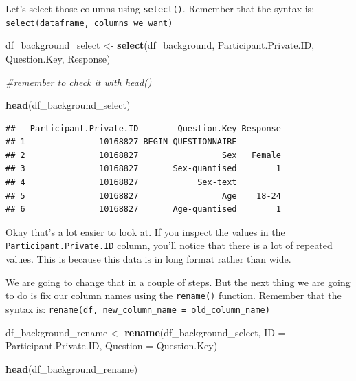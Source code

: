 \documentclass[
]{book}
\newenvironment{Shaded}{\begin{snugshade}}{\end{snugshade}}
\newcommand{\AttributeTok}[1]{\textcolor[rgb]{0.13,0.29,0.53}{#1}}
\newcommand{\CommentTok}[1]{\textcolor[rgb]{0.56,0.35,0.01}{\textit{#1}}}
\newcommand{\FunctionTok}[1]{\textcolor[rgb]{0.13,0.29,0.53}{\textbf{#1}}}
\newcommand{\NormalTok}[1]{#1}
\newcommand{\OtherTok}[1]{\textcolor[rgb]{0.56,0.35,0.01}{#1}}
\begin{document}
Let's select those columns using \texttt{select()}. Remember that the syntax is: \texttt{select(dataframe,\ columns\ we\ want)}

\begin{Shaded}
\begin{Highlighting}[]
\NormalTok{df\_background\_select }\OtherTok{\textless{}{-}} \FunctionTok{select}\NormalTok{(df\_background,}
\NormalTok{                               Participant.Private.ID,}
\NormalTok{                               Question.Key,}
\NormalTok{                               Response)}

\CommentTok{\#remember to check it with head()}

\FunctionTok{head}\NormalTok{(df\_background\_select)}
\end{Highlighting}
\end{Shaded}

\begin{verbatim}
##   Participant.Private.ID        Question.Key Response
## 1               10168827 BEGIN QUESTIONNAIRE         
## 2               10168827                 Sex   Female
## 3               10168827       Sex-quantised        1
## 4               10168827            Sex-text         
## 5               10168827                 Age    18-24
## 6               10168827       Age-quantised        1
\end{verbatim}

Okay that's a lot easier to look at. If you inspect the values in the \texttt{Participant.Private.ID} column, you'll notice that there is a lot of repeated values. This is because this data is in long format rather than wide.

We are going to change that in a couple of steps. But the next thing we are going to do is fix our column names using the \texttt{rename()} function. Remember that the syntax is: \texttt{rename(df,\ new\_column\_name\ =\ old\_column\_name)}

\begin{Shaded}
\begin{Highlighting}[]
\NormalTok{df\_background\_rename }\OtherTok{\textless{}{-}} \FunctionTok{rename}\NormalTok{(df\_background\_select,}
                               \AttributeTok{ID =}\NormalTok{ Participant.Private.ID,}
                               \AttributeTok{Question =}\NormalTok{ Question.Key)}

\FunctionTok{head}\NormalTok{(df\_background\_rename)}
\end{Highlighting}
\end{Shaded}
\end{document}

